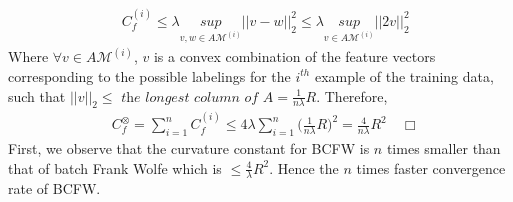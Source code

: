 \documentclass{article}
\begin{document}
\begin{equation*}
\begin{aligned}
    &C^{(i)}_{f}\leq \lambda \underset{v,w\in A\mathcal{M}^{(i)}}{sup}||v- w||^{2}_{2}\leq \lambda \underset{v\in A\mathcal{M}^{(i)}}{sup}||2v||^{2}_{2}
\end{aligned}
\end{equation*}
Where $\forall v\in A\mathcal{M}^{(i)}$, $v$ is a convex combination of the feature vectors corresponding to the possible labelings for the $i^{th}$ example of the training data, such that $||v||_{2}\leq\textit{ the longest column of A}= \frac{1}{n\lambda}R$. Therefore,
\begin{equation*}
\begin{aligned}
    &C^{\otimes}_{f}= \sum_{i=1}^{n}C^{(i)}_{f}\leq 4\lambda\sum_{i=1}^{n}\Big(\frac{1}{n\lambda}R\Big)^{2}= \frac{4}{n\lambda}R^{2}\quad\Box
\end{aligned}
\end{equation*}
First, we observe that the curvature constant for BCFW is $n$ times smaller than that of batch Frank Wolfe which is $\leq \frac{4}{\lambda}R^{2}$. Hence the $n$ times faster convergence rate of BCFW. 
\end{document}
